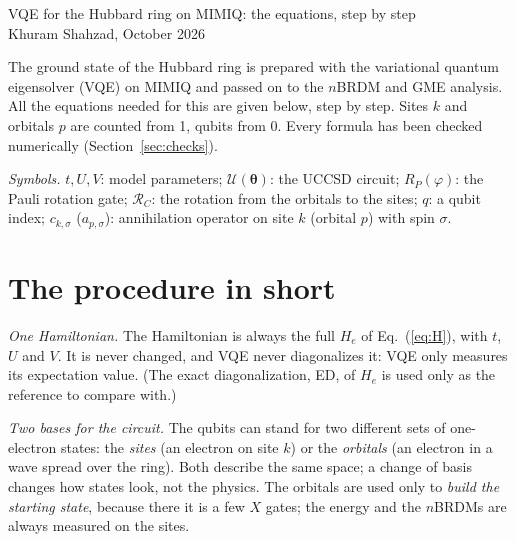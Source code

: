 \documentclass[11pt,a4paper]{article}
\begin{document}
\begin{center}
{\large VQE for the Hubbard ring on MIMIQ: the equations, step by step}\\[4pt]
Khuram Shahzad, October 2026
\end{center}

The ground state of the Hubbard ring is prepared with the variational quantum
eigensolver (VQE) on MIMIQ and passed on to the $n$BRDM and GME analysis. All
the equations needed for this are given below, step by step. Sites $k$ and
orbitals $p$ are counted from 1, qubits from 0. Every formula has been checked
numerically (Section~\ref{sec:checks}).

\emph{Symbols.} $t, U, V$: model parameters; $\mathcal{U}(\boldsymbol\theta)$:
the UCCSD circuit; $R_P(\varphi)$: the Pauli rotation gate;
$\mathcal{R}_C$: the rotation from the orbitals to the sites; $q$: a qubit
index; $c_{k,\sigma}$ ($a_{p,\sigma}$): annihilation operator on site $k$
(orbital $p$) with spin $\sigma$.

\section*{The procedure in short}

\emph{One Hamiltonian.} The Hamiltonian is always the full $H_e$ of
Eq.~(\ref{eq:H}), with $t$, $U$ and $V$. It is never changed, and VQE never
diagonalizes it: VQE only measures its expectation value. (The exact
diagonalization, ED, of $H_e$ is used only as the reference to compare with.)

\emph{Two bases for the circuit.} The qubits can stand for two different sets
of one-electron states: the \emph{sites} (an electron on site $k$) or the
\emph{orbitals} (an electron in a wave spread over the ring). Both describe the
same space; a change of basis changes how states look, not the physics. The
orbitals are used only to \emph{build the starting state}, because there it is
a few $X$ gates; the energy and the $n$BRDMs are always measured on the sites.
\end{document}
